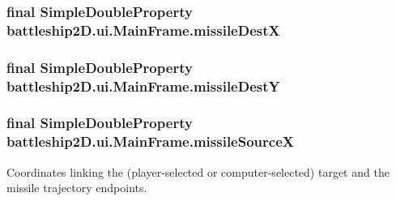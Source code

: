 \hypertarget{classbattleship2D_1_1ui_1_1MainFrame_adcd874489abd642b1ba53db27bb6fa13}{
\subsubsection[{missile\-Dest\-X}]{\setlength{\rightskip}{0pt plus 5cm}final Simple\-Double\-Property battleship2\-D.\-ui.\-Main\-Frame.\-missile\-Dest\-X\hspace{0.3cm}{\ttfamily [package]}}}\label{classbattleship2D_1_1ui_1_1MainFrame_adcd874489abd642b1ba53db27bb6fa13}
\hypertarget{classbattleship2D_1_1ui_1_1MainFrame_a5f4019ccf71bb434f200713f25307fff}{
\subsubsection[{missile\-Dest\-Y}]{\setlength{\rightskip}{0pt plus 5cm}final Simple\-Double\-Property battleship2\-D.\-ui.\-Main\-Frame.\-missile\-Dest\-Y\hspace{0.3cm}{\ttfamily [package]}}}\label{classbattleship2D_1_1ui_1_1MainFrame_a5f4019ccf71bb434f200713f25307fff}
\hypertarget{classbattleship2D_1_1ui_1_1MainFrame_afe5bf635e71814fb5386b25a226b4507}{
\subsubsection[{missile\-Source\-X}]{\setlength{\rightskip}{0pt plus 5cm}final Simple\-Double\-Property battleship2\-D.\-ui.\-Main\-Frame.\-missile\-Source\-X\hspace{0.3cm}{\ttfamily [private]}}}\label{classbattleship2D_1_1ui_1_1MainFrame_afe5bf635e71814fb5386b25a226b4507}


Coordinates linking the (player-\/selected or computer-\/selected) target and the missile trajectory endpoints. 

